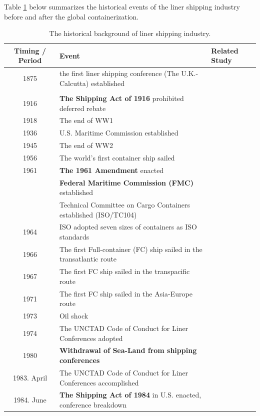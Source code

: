 \documentclass[11pt]{article}
\begin{document}
Table \ref{tb:industry_history} below summarizes the historical events of the liner shipping industry before and after the global containerization.
\begin{table}[ht!]
    \caption{The historical background of liner shipping industry.}
    \label{tb:industry_history}
    \centering\scriptsize{}
    \begin{tabular}{cll}
      Timing / Period & Event & Related Study\\\hline
      1875 & the first liner shipping conference (The U.K.-Calcutta) established & \cite{morton1997entry}\\
       &  & \cite{podolny1999social}\\
      1916 & \textbf{The Shipping Act of 1916} prohibited deferred rebate &\\
      1918 & The end of WW1 & \cite{deltas1999american}\\
      1936 & U.S. Maritime Commission established &\\
      1945 & The end of WW2 & \\
      1956 & The world's first container ship sailed & \\
      1961 & \textbf{The 1961 Amendment} enacted & \\
      & \textbf{Federal Maritime Commission (FMC)} established & \\
      & Technical Committee on Cargo Containers established (ISO/TC104) &\\
      1964 & ISO adopted seven sizes of containers as ISO standards &\\
      \hline
      1966 & The first Full-container (FC) ship sailed in the transatlantic route &\\
      1967 & The first FC ship sailed in the transpacific route &\\
      1971 & The first FC ship sailed in the Asia-Europe route& \\
      1973 & Oil shock &\\
      1974 & The UNCTAD Code of Conduct for Liner Conferences adopted &\cite{fox1992empirical,fox1995some}\\
      1980 & \textbf{Withdrawal of Sea-Land from shipping conferences}&\cite{sjostrom1989collusion}\\
      1983. April&The UNCTAD Code of Conduct for Liner Conferences accomplished &\\
      1984. June & \textbf{The Shipping Act of 1984} in U.S. enacted, conference breakdown &\cite{clyde1995effectiveness,clyde1998market}\\

\end{tabular}
\end{table}
\end{document}

